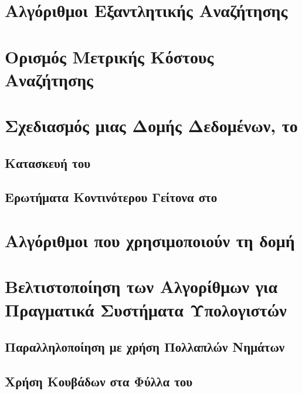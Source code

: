 \section{Αλγόριθμοι Εξαντλητικής Αναζήτησης}
\label{sec:exhaustive_search}

\section{Ορισμός Μετρικής Κόστους Αναζήτησης}
\label{sec:cost_metric}

\section{Σχεδιασμός μιας  Δομής Δεδομένων, το }
\subsection{Κατασκευή του }
\subsection{Ερωτήματα Κοντινότερου Γείτονα στο }

\section{Αλγόριθμοι που χρησιμοποιούν τη δομή }

\section{Βελτιστοποίηση των Αλγορίθμων για Πραγματικά Συστήματα Υπολογιστών}
\subsection{Παραλληλοποίηση με χρήση Πολλαπλών Νημάτων }
\subsection{Χρήση Κουβάδων στα Φύλλα του }
